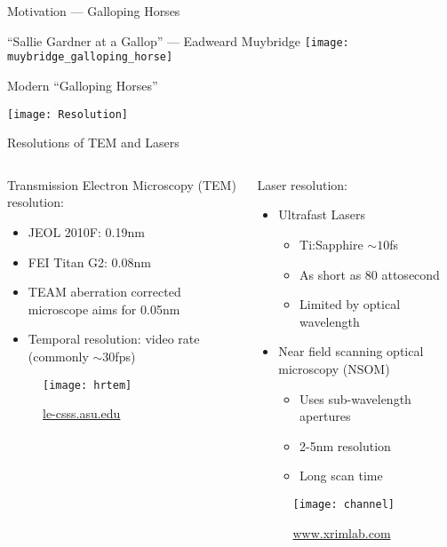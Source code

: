 \begin{frame}{Motivation --- Galloping Horses}
  \begin{center}
    ``Sallie Gardner at a Gallop'' --- Eadweard Muybridge
    \texttt{[image: muybridge\_galloping\_horse]}
  \end{center}
\end{frame}

\begin{frame}{Modern ``Galloping Horses''}
  \begin{center}
    \texttt{[image: Resolution]}
  \end{center}
\end{frame}

\begin{frame}{Resolutions of TEM and Lasers}
  \begin{columns}	
    \begin{column}{0.49\linewidth}
      Transmission Electron Microscopy (TEM) resolution:
      \begin{itemize}
        \item<2-> JEOL 2010F: 0.19nm
        \item<2-> FEI Titan G2: 0.08nm
        \item<2-> TEAM aberration corrected microscope aims for 0.05nm
        \item<2-> Temporal resolution: video rate (commonly $\sim$30fps)
      \end{itemize}
      \begin{figure}
        \centering
        \texttt{[image: hrtem]}
        \caption{\url{le-csss.asu.edu}}
      \end{figure}
    \end{column}
    \begin{column}{0.49\linewidth}
      Laser resolution:
      \begin{itemize}
        \item<3-> Ultrafast Lasers
        \begin{itemize}
          \item<3-> Ti:Sapphire $\sim 10$fs 
          \item<3-> As short as 80 attosecond
          \item<3-> Limited by optical wavelength
        \end{itemize}
        \item<4-> Near field scanning optical microscopy (NSOM)
        \begin{itemize}
          \item<4-> Uses sub-wavelength apertures
          \item<4-> 2-5nm resolution
          \item<4-> Long scan time
        \end{itemize}
      \end{itemize}
      \begin{figure}
        \centering
        \texttt{[image: channel]}
        \caption{\url{www.xrimlab.com}}
      \end{figure}
    \end{column}
  \end{columns}
\end{frame}


